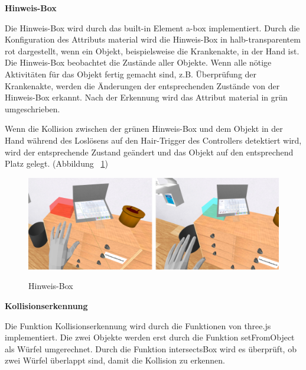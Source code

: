   \vspace{1em}
  \noindent
  \textbf{Hinweis-Box}
  \vspace{1em}
  
  \noindent
  Die Hinweis-Box wird durch das built-in Element {\selectfont a-box} implementiert. Durch die Konfiguration des Attributs {\selectfont material} wird die Hinweis-Box in halb-transparentem rot dargestellt, wenn ein Objekt, beispielsweise die Krankenakte, in der Hand ist. Die Hinweis-Box beobachtet die Zustände aller Objekte. Wenn alle nötige Aktivitäten für das Objekt fertig gemacht sind, z.B. Überprüfung der Krankenakte, werden die Änderungen der entsprechenden Zustände von der Hinweis-Box erkannt. Nach der Erkennung wird das Attribut {\selectfont material} in grün umgeschrieben.
  
  Wenn die Kollision zwischen der grünen Hinweis-Box und dem Objekt in der Hand während des Loslösens auf den Hair-Trigger des Controllers detektiert wird, wird der entsprechende Zustand geändert und das Objekt auf den entsprechend Platz gelegt. (Abbildung ~\ref{fig:Hinweis-box})
  
\begin{figure}[ht]
\vspace*{1em}
\centering
\caption[Hinweis-Box]{Hinweis-Box}
\includegraphics[width=\textwidth]{images/krankenakteChecken.png}
\label{fig:Hinweis-box} 
\end{figure}
  
  \vspace{1em}
  \noindent
  \textbf{Kollisionserkennung}
  \vspace{1em}
  
  \noindent
  Die Funktion Kollisionserkennung wird durch die Funktionen von three.js implementiert. Die zwei Objekte werden erst durch die Funktion {\selectfont setFromObject} als Würfel umgerechnet. Durch die Funktion {\selectfont intersectsBox} wird es überprüft, ob zwei Würfel überlappt sind, damit die Kollision zu erkennen.
  
